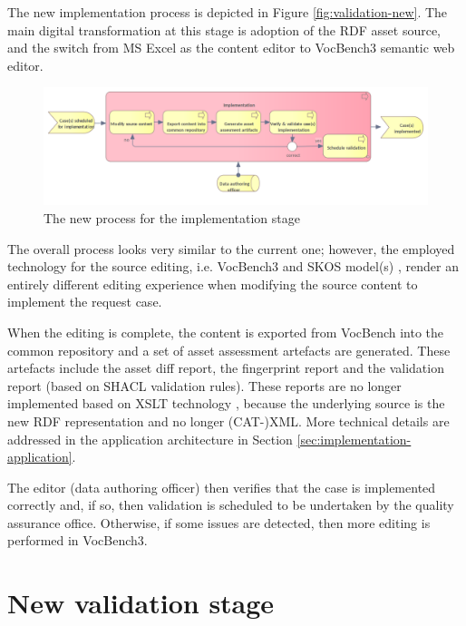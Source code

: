 	The new implementation process is depicted in Figure \ref{fig:validation-new}. The main digital transformation at this stage is adoption of the RDF asset source, and the switch from MS Excel as the content editor to VocBench3 \citep{stellato2017towards,stellatovocbench} semantic web editor. 
	
	\begin{figure}[h]
		\centering
		\includegraphics[width=1.05\textwidth]{images/business/new/Implementation.png}
		\caption{The new process for the implementation stage}
		\label{fig:implementation-new}
	\end{figure} 

	The overall process looks very similar to the current one; however, the employed technology for the source editing, i.e. VocBench3 \citep{stellatovocbench} and SKOS model(s) \citep{skos-spec}, render an entirely different editing experience when modifying the source content to implement the request case.
	
	When the editing is complete, the content is exported from VocBench into the common repository and a set of asset assessment artefacts are generated. These artefacts include the asset diff report, the fingerprint report and the validation report (based on SHACL \citep{shacl-spec} validation rules). These reports are no longer implemented based on XSLT technology \citep{xslt3-Kay}, because the underlying source is the new RDF representation \citep{rdf11} and no longer (CAT-)XML. More technical details are addressed in the application architecture in Section \ref{sec:implementation-application}.
	
	The editor (data authoring officer) then verifies that the case is implemented correctly and, if so, then validation is scheduled to be undertaken by the quality assurance office. Otherwise, if some issues are detected, then more editing is performed in VocBench3.
		
	
	\section{New validation stage}
	\label{sec:validation-new}	
	
